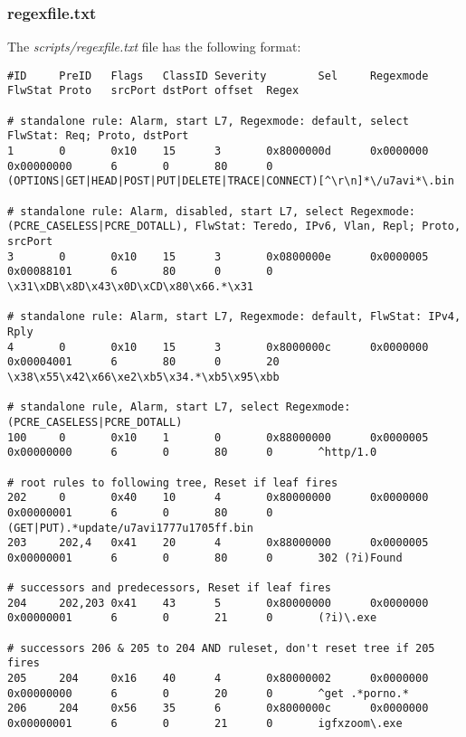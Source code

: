 \documentclass[documentation]{subfiles}
\begin{document}
\subsubsection{regexfile.txt}\label{regexfile.txt}
The {\em scripts/regexfile.txt} file has the following format:
\begin{center}
\begin{lstlisting}
#ID     PreID   Flags   ClassID Severity        Sel     Regexmode       FlwStat Proto   srcPort dstPort offset  Regex

# standalone rule: Alarm, start L7, Regexmode: default, select FlwStat: Req; Proto, dstPort
1       0       0x10    15      3       0x8000000d      0x0000000       0x00000000      6       0       80      0       (OPTIONS|GET|HEAD|POST|PUT|DELETE|TRACE|CONNECT)[^\r\n]*\/u7avi*\.bin

# standalone rule: Alarm, disabled, start L7, select Regexmode: (PCRE_CASELESS|PCRE_DOTALL), FlwStat: Teredo, IPv6, Vlan, Repl; Proto, srcPort
3       0       0x10    15      3       0x0800000e      0x0000005       0x00088101      6       80      0       0       \x31\xDB\x8D\x43\x0D\xCD\x80\x66.*\x31

# standalone rule: Alarm, start L7, Regexmode: default, FlwStat: IPv4, Rply
4       0       0x10    15      3       0x8000000c      0x0000000       0x00004001      6       80      0       20      \x38\x55\x42\x66\xe2\xb5\x34.*\xb5\x95\xbb

# standalone rule, Alarm, start L7, select Regexmode: (PCRE_CASELESS|PCRE_DOTALL)
100     0       0x10    1       0       0x88000000      0x0000005       0x00000000      6       0       80      0       ^http/1.0

# root rules to following tree, Reset if leaf fires
202     0       0x40    10      4       0x80000000      0x0000000       0x00000001      6       0       80      0       (GET|PUT).*update/u7avi1777u1705ff.bin
203     202,4   0x41    20      4       0x88000000      0x0000005       0x00000001      6       0       80      0       302 (?i)Found

# successors and predecessors, Reset if leaf fires
204     202,203 0x41    43      5       0x80000000      0x0000000       0x00000001      6       0       21      0       (?i)\.exe

# successors 206 & 205 to 204 AND ruleset, don't reset tree if 205 fires
205     204     0x16    40      4       0x80000002      0x0000000       0x00000000      6       0       20      0       ^get .*porno.*
206     204     0x56    35      6       0x8000000c      0x0000000       0x00000001      6       0       21      0       igfxzoom\.exe
\end{lstlisting}
\end{center}
\end{document}
